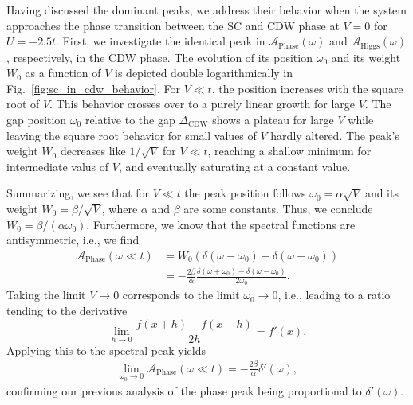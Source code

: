 \documentclass[
    reprint, 
    aps,
    preprintnumbers,
    twocolumn,
    prb,
    superscriptaddress
]{revtex4-2}
\newcommand{\spectral}[1]{\mathcal{A}_\text{#1}  (\omega)}
\newcommand{\bs}{\begin{subequations}}
\newcommand{\es}{\end{subequations}}
\begin{document}
Having discussed the dominant peaks, we address their behavior when 
the system approaches the phase transition between the SC and CDW phase at $V=0$ for $U=-2.5t$.
First, we investigate the identical peak in $\spectral{Phase}$ and $\spectral{Higgs}$, respectively, in the CDW phase.
The evolution of its position $\omega_0$ and its weight $W_0$ as a function of $V$ is depicted
double logarithmically in Fig.\ \ref{fig:sc_in_cdw_behavior}.
For $V \ll t$, the position increases with the square root of $V$. 
This behavior crosses over to a purely linear growth for large $V$.
The gap position $\omega_0$ relative to the gap $\Delta_\text{CDW}$ shows a plateau for large $V$ 
while leaving the square root behavior for small values of $V$ hardly altered.
The peak's weight $W_0$ decreases like $1/\sqrt{V}$ for $V \ll t$,
reaching a shallow minimum for intermediate valus of $V$, and 
eventually saturating at a constant value.

Summarizing, we see that for $V \ll t$ the peak position follows 
$\omega_0 = \alpha \sqrt{V}$ and its weight  $W_0 = \beta / \sqrt{V}$, 
where $\alpha$ and $\beta$ are some constants. Thus, we conclude $W_0 = \beta / (\alpha \omega_0)$. 
Furthermore, we know that the spectral functions are antisymmetric, i.e., we find
\bs
\begin{align}
    \mathcal{A}_\text{Phase} (\omega \ll t) &= W_0 (\delta (\omega - \omega_0) - \delta (\omega + \omega_0)) 
		\\
    &= - \frac{2\beta}{\alpha} \frac{\delta (\omega + \omega_0) - \delta (\omega - \omega_0)}{2\omega_0}.
\end{align} 
\es
Taking the limit $V \to 0$ corresponds to the limit $\omega_0 \to 0$, i.e., leading to a ratio tending to the
derivative
\begin{equation}
    \lim_{h \to 0} \frac{f(x + h) - f(x - h)}{2h} = f'(x).
\end{equation}
Applying this to the spectral peak yields
\begin{align}
    \lim_{\omega_0 \to 0} \mathcal{A}_\text{Phase} (\omega \ll t) = - \frac{2 \beta}{\alpha} \delta'(\omega),
\end{align}
confirming our previous analysis of the phase peak being proportional to  $\delta' (\omega)$.

\end{document}
